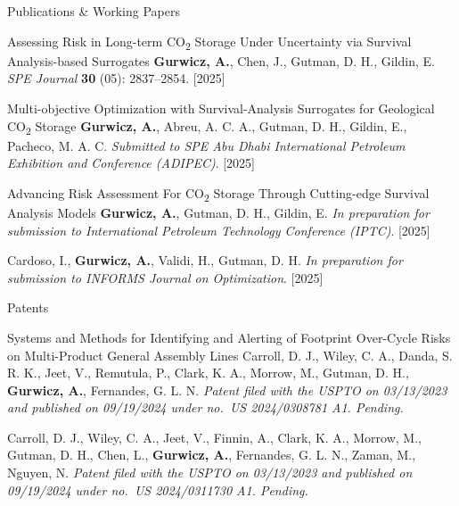 \begin{cvcontentsection}{Publications \& Working Papers}

\cvpublication
    {Assessing Risk in Long-term CO\textsubscript{2} Storage Under Uncertainty via Survival Analysis-based Surrogates}
    {\textbf{Gurwicz, A.}, Chen, J., Gutman, D. H., Gildin, E.}
    {\textit{SPE Journal} \textbf{30} (05): 2837--2854. }
    [2025]

\cvpublication
    {Multi-objective Optimization with Survival-Analysis Surrogates for Geological CO\textsubscript{2} Storage}
    {\textbf{Gurwicz, A.}, Abreu, A. C. A., Gutman, D. H., Gildin, E., Pacheco, M. A. C.}
    {\textit{Submitted to SPE Abu Dhabi International Petroleum Exhibition and Conference (ADIPEC)}.}
    [2025]

\cvpublication
    {Advancing Risk Assessment For CO\textsubscript{2} Storage Through Cutting-edge Survival Analysis Models}
    {\textbf{Gurwicz, A.}, Gutman, D. H., Gildin, E.}
    {\textit{In preparation for submission to International Petroleum Technology Conference (IPTC)}.}
    [2025]

    {Cardoso, I., \textbf{Gurwicz, A.}, Validi, H., Gutman, D. H.}
    {\textit{In preparation for submission to INFORMS Journal on Optimization}.}
    [2025]

\end{cvcontentsection}

\begin{cvcontentsection}{Patents}

\cvpublication
    {Systems and Methods for Identifying and Alerting of Footprint Over-Cycle Risks on Multi-Product General Assembly
    Lines}
    {Carroll, D. J., Wiley, C. A., Danda, S. R. K., Jeet, V., Remutula, P., Clark, K. A., Morrow, M., Gutman, D. H.,
    \textbf{Gurwicz, A.}, Fernandes, G. L. N.}
    {\textit{Patent filed with the USPTO on 03/13/2023 and published on 09/19/2024 under no.\ US 2024/0308781 A1. Pending.}}

    {Carroll, D. J., Wiley, C. A., Jeet, V., Finnin, A., Clark, K. A., Morrow, M., Gutman, D. H., Chen, L.,
    \textbf{Gurwicz, A.}, Fernandes, G. L. N., Zaman, M., Nguyen, N.}
    {\textit{Patent filed with the USPTO on 03/13/2023 and published on 09/19/2024 under no.\ US 2024/0311730 A1. Pending.}}

\end{cvcontentsection}

